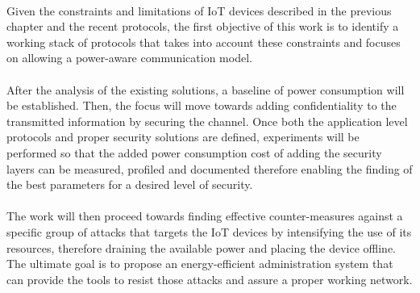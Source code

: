 \paragraph{}
Given the constraints and limitations of \ac{IoT} devices described in the previous chapter and the recent protocols, the first objective of this work is to identify a working stack of protocols that takes into account these constraints and focuses on allowing a power-aware communication model.

\paragraph{}
After the analysis of the existing solutions, a baseline of power consumption will be established. Then, the focus will move towards adding confidentiality to the transmitted information by securing the channel.
Once both the application level protocols and proper security solutions are defined, experiments will be performed so that the added power consumption cost of adding the security layers can be measured, profiled and documented therefore enabling the finding of the best parameters for a desired level of security.

\paragraph{}
The work will then proceed towards finding effective counter-measures against a specific group of attacks that targets the \ac{IoT} devices by intensifying the use of its resources, therefore draining the available power and placing the device offline. The ultimate goal is to propose an energy-efficient administration system that can provide the tools to resist those attacks and assure a proper working network.